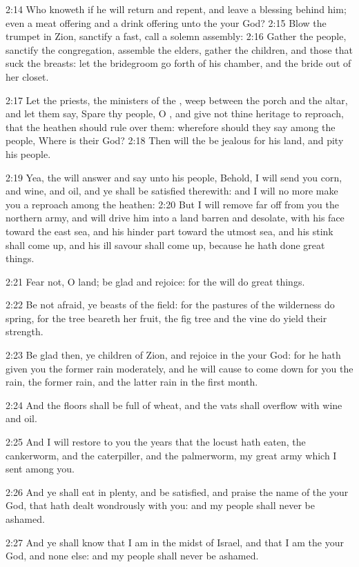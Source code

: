 2:14 Who knoweth if he will return and repent, and leave a blessing
behind him; even a meat offering and a drink offering unto the \LORD
your God?  2:15 Blow the trumpet in Zion, sanctify a fast, call a
solemn assembly: 2:16 Gather the people, sanctify the congregation,
assemble the elders, gather the children, and those that suck the
breasts: let the bridegroom go forth of his chamber, and the bride out
of her closet.

2:17 Let the priests, the ministers of the \LORD, weep between the
porch and the altar, and let them say, Spare thy people, O \LORD, and
give not thine heritage to reproach, that the heathen should rule over
them: wherefore should they say among the people, Where is their God?
2:18 Then will the \LORD be jealous for his land, and pity his people.

2:19 Yea, the \LORD will answer and say unto his people, Behold, I will
send you corn, and wine, and oil, and ye shall be satisfied therewith:
and I will no more make you a reproach among the heathen: 2:20 But I
will remove far off from you the northern army, and will drive him
into a land barren and desolate, with his face toward the east sea,
and his hinder part toward the utmost sea, and his stink shall come
up, and his ill savour shall come up, because he hath done great
things.

2:21 Fear not, O land; be glad and rejoice: for the \LORD will do great
things.

2:22 Be not afraid, ye beasts of the field: for the pastures of the
wilderness do spring, for the tree beareth her fruit, the fig tree and
the vine do yield their strength.

2:23 Be glad then, ye children of Zion, and rejoice in the \LORD your
God: for he hath given you the former rain moderately, and he will
cause to come down for you the rain, the former rain, and the latter
rain in the first month.

2:24 And the floors shall be full of wheat, and the vats shall
overflow with wine and oil.

2:25 And I will restore to you the years that the locust hath eaten,
the cankerworm, and the caterpiller, and the palmerworm, my great army
which I sent among you.

2:26 And ye shall eat in plenty, and be satisfied, and praise the name
of the \LORD your God, that hath dealt wondrously with you: and my
people shall never be ashamed.

2:27 And ye shall know that I am in the midst of Israel, and that I am
the \LORD your God, and none else: and my people shall never be
ashamed.

